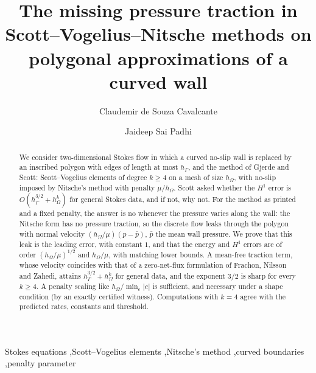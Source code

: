 \documentclass[5p,times]{elsarticle}
\theoremstyle{definition}
\begin{document}
\begin{frontmatter}
\title{The missing pressure traction in Scott--Vogelius--Nitsche methods on polygonal approximations of a curved wall}

\author[cav]{Claudemir de Souza Cavalcante}
\address[cav]{Universidade Federal do Par\'a, Bel\'em, PA, Brazil}
\author[pur]{Jaideep Sai Padhi}
\address[pur]{Department of Computer Science, Purdue University, West Lafayette, IN 47907, USA}

\begin{abstract}
We consider two-dimensional Stokes flow in which a curved no-slip wall is replaced by an inscribed polygon with edges of length at most $h_\Gamma$, and the method of Gjerde and Scott: Scott--Vogelius elements of degree $k\ge4$ on a mesh of size $h_\Omega$, with no-slip imposed by Nitsche's method with penalty $\mu/h_\Omega$. Scott asked whether the $H^1$ error is $O(h_\Gamma^{3/2}+h_\Omega^k)$ for general Stokes data, and if not, why not. For the method as printed and a fixed penalty, the answer is no whenever the pressure varies along the wall: the Nitsche form has no pressure traction, so the discrete flow leaks through the polygon with normal velocity $(h_\Omega/\mu)(p-\bar p)$, $\bar p$ the mean wall pressure. We prove that this leak is the leading error, with constant $1$, and that the energy and $H^1$ errors are of order $(h_\Omega/\mu)^{1/2}$ and $h_\Omega/\mu$, with matching lower bounds. A mean-free traction term, whose velocity coincides with that of a zero-net-flux formulation of Frachon, Nilsson and Zahedi, attains $h_\Gamma^{3/2}+h_\Omega^k$ for general data, and the exponent $3/2$ is sharp for every $k\ge4$. A penalty scaling like $h_\Omega/\min_e|e|$ is sufficient, and necessary under a shape condition (by an exactly certified witness). Computations with $k=4$ agree with the predicted rates, constants and threshold.
\end{abstract}

\begin{keyword}
Stokes equations \sep Scott--Vogelius elements \sep Nitsche's method \sep curved boundaries \sep penalty parameter
\end{keyword}
\end{frontmatter}
\end{document}
